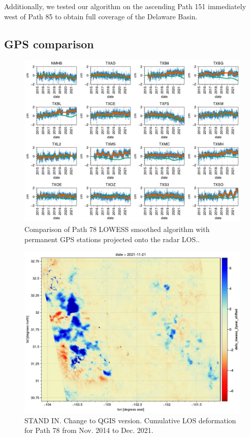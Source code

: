 Additionally, we tested our algorithm on the ascending Path 151 immediately west of Path 85 to obtain full coverage of the Delaware Basin.

\subsection{GPS comparison}


\begin{figure}
	\centering
	\includegraphics[width=.99\textwidth]{figures/chapter5-lowess/gps_path78.pdf}
	\caption[GPS comparison for Path 78 LOWESS smoothing]{
		Comparison of Path 78 LOWESS smoothed algorithm with permanent GPS stations projected onto the radar LOS..
	}
	\label{fig:ch5-results-gpsi}
\end{figure}


\begin{figure}
	\centering
	\includegraphics[width=.99\textwidth]{figures/chapter5-lowess/deformation_path78.pdf}
	\caption[GPS comparison for Path 78 LOWESS smoothing]{
STAND IN. Change to QGIS version.
Cumulative LOS deformation for Path 78 from Nov. 2014 to Dec. 2021.
	}
	\label{fig:ch5-results-path78}
\end{figure}

